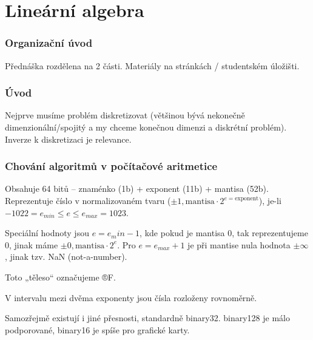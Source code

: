\documentclass[12pt]{article}					%
\begin{document}
\part{Lineární algebra}


\section*{Organizační úvod}
\begin{poznamka}
	Přednáška rozdělena na 2 části. Materiály na stránkách / studentském úložišti.
\end{poznamka}

\section*{Úvod}
\begin{poznamka}
	Nejprve musíme problém diskretizovat (většinou bývá nekonečně dimenzionální/spojitý a my chceme konečnou dimenzi a diskrétní problém). Inverze k diskretizaci je relevance.
\end{poznamka}

\section{Chování algoritmů v počítačové aritmetice}
\begin{definice}
	Obsahuje 64 bitů – znaménko (1b) + exponent (11b) + mantisa (52b). Reprezentuje číslo v normalizovaném tvaru ($±1,\text{mantisa}·2^{e = \text{exponent}}$), je-li $-1022 = e_{min} ≤ e ≤ e_{max} = 1023$.

	Speciální hodnoty jsou $e = e_min - 1$, kde pokud je mantisa $0$, tak reprezentujeme $0$, jinak máme $±0,\text{mantisa}·2^e$. Pro $e = e_{max} + 1$ je při mantise nula hodnota $±∞$, jinak tzv. NaN (not-a-number).

	Toto „těleso“ označujeme ®F.

	\begin{poznamkain}
		V intervalu mezi dvěma exponenty jsou čísla rozloženy rovnoměrně.
	\end{poznamkain}

	\begin{poznamkain}
		Samozřejmě existují i jiné přesnosti, standardně binary32. binary128 je málo podporované, binary16 je spíše pro grafické karty.
	\end{poznamkain}
\end{definice}	
\end{document}
